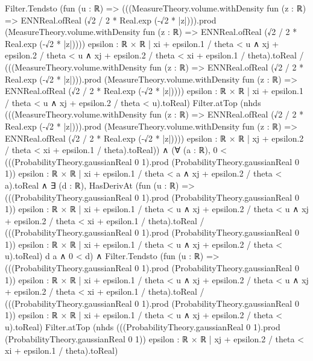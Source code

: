 \documentclass[10pt]{article}
\begin{document}
\begin{ReviewVerbatim}
      Filter.Tendsto
        (fun (u : ℝ) =>
          (((MeasureTheory.volume.withDensity fun (z : ℝ) => ENNReal.ofReal (√2 / 2 * Real.exp (-√2 * |z|))).prod
                  (MeasureTheory.volume.withDensity fun (z : ℝ) => ENNReal.ofReal (√2 / 2 * Real.exp (-√2 * |z|))))
                {epsilon : ℝ × ℝ |
                  xi + epsilon.1 / theta < u ∧
                    xj + epsilon.2 / theta < u ∧ xj + epsilon.2 / theta < xi + epsilon.1 / theta}).toReal /
            (((MeasureTheory.volume.withDensity fun (z : ℝ) => ENNReal.ofReal (√2 / 2 * Real.exp (-√2 * |z|))).prod
                  (MeasureTheory.volume.withDensity fun (z : ℝ) => ENNReal.ofReal (√2 / 2 * Real.exp (-√2 * |z|))))
                {epsilon : ℝ × ℝ | xi + epsilon.1 / theta < u ∧ xj + epsilon.2 / theta < u}).toReal)
        Filter.atTop
        (nhds
          (((MeasureTheory.volume.withDensity fun (z : ℝ) => ENNReal.ofReal (√2 / 2 * Real.exp (-√2 * |z|))).prod
                (MeasureTheory.volume.withDensity fun (z : ℝ) => ENNReal.ofReal (√2 / 2 * Real.exp (-√2 * |z|))))
              {epsilon : ℝ × ℝ | xj + epsilon.2 / theta < xi + epsilon.1 / theta}).toReal)) ∧
  (∀ (a : ℝ),
      0 <
          (((ProbabilityTheory.gaussianReal 0 1).prod (ProbabilityTheory.gaussianReal 0 1))
              {epsilon : ℝ × ℝ | xi + epsilon.1 / theta < a ∧ xj + epsilon.2 / theta < a}).toReal ∧
        ∃ (d : ℝ),
          HasDerivAt
              (fun (u : ℝ) =>
                (((ProbabilityTheory.gaussianReal 0 1).prod (ProbabilityTheory.gaussianReal 0 1))
                      {epsilon : ℝ × ℝ |
                        xi + epsilon.1 / theta < u ∧
                          xj + epsilon.2 / theta < u ∧ xj + epsilon.2 / theta < xi + epsilon.1 / theta}).toReal /
                  (((ProbabilityTheory.gaussianReal 0 1).prod (ProbabilityTheory.gaussianReal 0 1))
                      {epsilon : ℝ × ℝ | xi + epsilon.1 / theta < u ∧ xj + epsilon.2 / theta < u}).toReal)
              d a ∧
            0 < d) ∧
    Filter.Tendsto
      (fun (u : ℝ) =>
        (((ProbabilityTheory.gaussianReal 0 1).prod (ProbabilityTheory.gaussianReal 0 1))
              {epsilon : ℝ × ℝ |
                xi + epsilon.1 / theta < u ∧
                  xj + epsilon.2 / theta < u ∧ xj + epsilon.2 / theta < xi + epsilon.1 / theta}).toReal /
          (((ProbabilityTheory.gaussianReal 0 1).prod (ProbabilityTheory.gaussianReal 0 1))
              {epsilon : ℝ × ℝ | xi + epsilon.1 / theta < u ∧ xj + epsilon.2 / theta < u}).toReal)
      Filter.atTop
      (nhds
        (((ProbabilityTheory.gaussianReal 0 1).prod (ProbabilityTheory.gaussianReal 0 1))
            {epsilon : ℝ × ℝ | xj + epsilon.2 / theta < xi + epsilon.1 / theta}).toReal)
\end{ReviewVerbatim}
\end{document}
